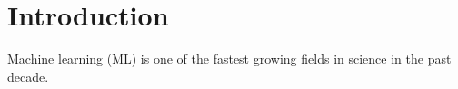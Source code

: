 \chapter{Introduction}
  Machine learning (ML) is one of the fastest growing fields in science in the past decade. 
\chapterend